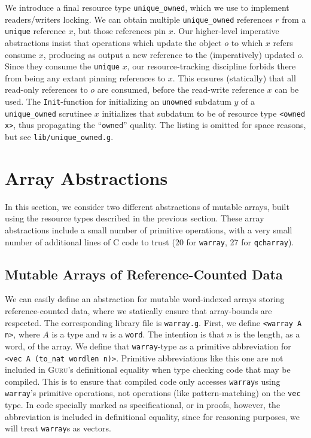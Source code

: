 \documentclass[9pt,natbib]{sigplanconf}
\begin{document}
We introduce a final resource type \texttt{unique\_owned}, which we
use to implement readers/writers locking.  We can obtain multiple
\texttt{unique\_owned} references $r$ from a \texttt{unique} reference
$x$, but those references pin $x$.  Our higher-level imperative
abstractions insist that operations which update the object $o$ to
which $x$ refers consume $x$, producing as output a new reference to
the (imperatively) updated $o$.  Since they consume the
\texttt{unique} $x$, our resource-tracking discipline forbids there
from being any extant pinning references to $x$.  This ensures
(statically) that all read-only references to $o$ are consumed, before
the read-write reference $x$ can be used.  The \texttt{Init}-function
for initializing an \texttt{unowned} subdatum $y$ of a
\texttt{unique\_owned} scrutinee $x$ initializes that subdatum to be
of resource type \texttt{<owned x>}, thus propagating the
``\texttt{owned}'' quality.  The listing is omitted for space
reasons, but see \texttt{lib/unique\_owned.g}.

\section{Array Abstractions}

In this section, we consider two different abstractions of mutable
arrays, built using the resource types described in the previous
section.  These array abstractions include a small number of primitive
operations, with a very small number of additional lines of C code to
trust (20 for \texttt{warray}, 27 for \texttt{qcharray}).  

\subsection{Mutable Arrays of Reference-Counted Data}
\label{sec:arrays}

We can easily define an abstraction for mutable word-indexed arrays
storing reference-counted data, where we statically ensure that
array-bounds are respected.  The corresponding library file is
\texttt{warray.g}.  First, we define \texttt{<warray A n>}, where $A$
is a type and $n$ is a \texttt{word}.  The intention is that $n$ is
the length, as a word, of the array.  We define that
\texttt{warray}-type as a primitive abbreviation for \texttt{<vec A
  (to\_nat wordlen n)>}.  Primitive abbreviations like this one are
not included in \textsc{Guru}'s definitional equality when type
checking code that may be compiled.  This is to ensure that compiled
code only accesses \texttt{warray}s using \texttt{warray}'s primitive
operations, not operations (like pattern-matching) on the \texttt{vec}
type.  In code specially marked as specificational, or in proofs,
however, the abbreviation is included in definitional equality, since
for reasoning purposes, we will treat \texttt{warray}s as vectors.
\end{document}
